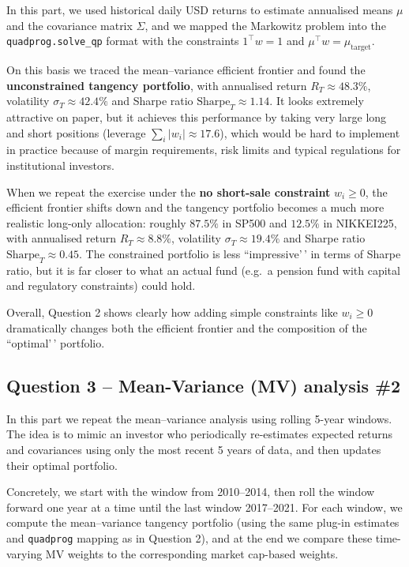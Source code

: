 \documentclass[11pt]{article}
\begin{document}
In this part, we used historical daily USD returns to estimate
annualised means \(\mu\) and the covariance matrix \(\Sigma\), and we
mapped the Markowitz problem into the \texttt{quadprog.solve\_qp} format
with the constraints \(1^\top w = 1\) and
\(\mu^\top w = \mu_{\text{target}}\).

On this basis we traced the mean--variance efficient frontier and found
the \textbf{unconstrained tangency portfolio}, with annualised return
\(R_T \approx 48.3\%\), volatility \(\sigma_T \approx 42.4\%\) and
Sharpe ratio \(\text{Sharpe}_T \approx 1.14\). It looks extremely
attractive on paper, but it achieves this performance by taking very
large long and short positions (leverage \(\sum_i |w_i| \approx 17.6\)),
which would be hard to implement in practice because of margin
requirements, risk limits and typical regulations for institutional
investors.

When we repeat the exercise under the \textbf{no short-sale constraint}
\(w_i \ge 0\), the efficient frontier shifts down and the tangency
portfolio becomes a much more realistic long-only allocation: roughly
\(87.5\%\) in SP500 and \(12.5\%\) in NIKKEI225, with annualised return
\(R_T \approx 8.8\%\), volatility \(\sigma_T \approx 19.4\%\) and Sharpe
ratio \(\text{Sharpe}_T \approx 0.45\). The constrained portfolio is
less ``impressive'\,' in terms of Sharpe ratio, but it is far closer to
what an actual fund (e.g.~a pension fund with capital and regulatory
constraints) could hold.

Overall, Question 2 shows clearly how adding simple constraints like
\(w_i \ge 0\) dramatically changes both the efficient frontier and the
composition of the ``optimal'\,' portfolio.

    \hypertarget{question-3-mean-variance-mv-analysis-2}{%
\subsection{Question 3 -- Mean-Variance (MV) analysis
\#2}\label{question-3-mean-variance-mv-analysis-2}}

In this part we repeat the mean--variance analysis using rolling 5-year
windows.\\
The idea is to mimic an investor who periodically re-estimates expected
returns and covariances using only the most recent 5 years of data, and
then updates their optimal portfolio.

Concretely, we start with the window from 2010--2014, then roll the
window forward one year at a time until the last window 2017--2021. For
each window, we compute the mean--variance tangency portfolio (using the
same plug-in estimates and \texttt{quadprog} mapping as in Question 2),
and at the end we compare these time-varying MV weights to the
corresponding market cap-based weights.
\end{document}
